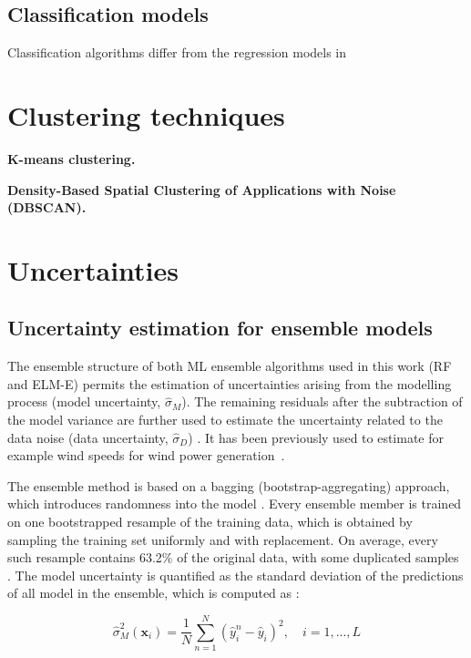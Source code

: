 \subsection{Classification models}
\label{ML_class}
 
 Classification algorithms differ from the regression models in 
 
\section{Clustering techniques}
\textbf{K-means clustering.}

\textbf{Density-Based Spatial Clustering of Applications with Noise (DBSCAN).}


\section{Uncertainties}
\subsection{Uncertainty estimation for ensemble models}
\label{unc_ML}

The ensemble structure of both ML ensemble algorithms used in this work (RF and ELM-E) permits the estimation of uncertainties arising from the modelling process (model uncertainty, $\hat{\sigma}_M$). The remaining residuals after the subtraction of the model variance are further used to estimate the uncertainty related to the data noise (data uncertainty, $\hat{\sigma}_D$) \cite{akusok_per-sample_2019,guignard_uncertainty_2020}. 
It has been previously used to estimate for example wind speeds for wind power generation~\cite{wan_probabilistic_2014}.

The ensemble method is based on a bagging (bootstrap-aggregating) approach, which introduces randomness into the model  \cite{breiman_bagging_1996}.
Every ensemble member is trained on one bootstrapped resample of the training data, which is
obtained by sampling the training set uniformly and with replacement.
On average, every such resample contains 63.2\% of the original data, with some duplicated samples \cite{breiman_bagging_1996}. 
The model uncertainty is quantified as the standard deviation of the predictions of all model in the ensemble, which is computed as \cite{heskes_practical_1997}:

\begin{equation}
\label{eq:model_unc}
  \hat{\sigma}_M^2 (\mathbf{x}_i) = \frac{1}{N} \sum_{n=1}^N (\hat{y}_i^n - \hat{y}_i)^2, \quad i=1,...,L
\end{equation}

